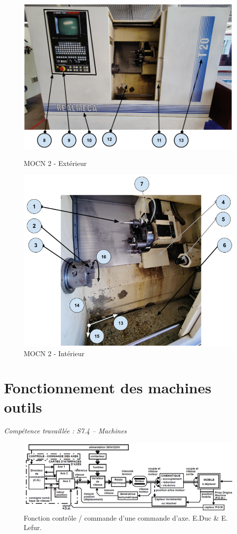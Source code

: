 \documentclass[12pt]{article}
\begin{document}
\begin{figure}
\centering
\includegraphics[width=0.75\linewidth]{MOCN21.PNG}
\caption{MOCN 2 - Extérieur}
\label{MOCN21}


\centering
\includegraphics[width=0.75\linewidth]{MOCN22.PNG}
\caption{MOCN 2 - Intérieur}
\label{MOCN22}
\end{figure}




\newpage


\section{Fonctionnement des machines outils}
\textit{Compétence travaillée : S7.4 – Machines}

\begin{figure}
\centering
\includegraphics[width=1\linewidth]{fonction1.PNG}
\caption{Fonction contrôle / commande d’une commande d’axe. E.Duc \& E. Lefur.}
\label{F1}
\end{figure}
\end{document}
